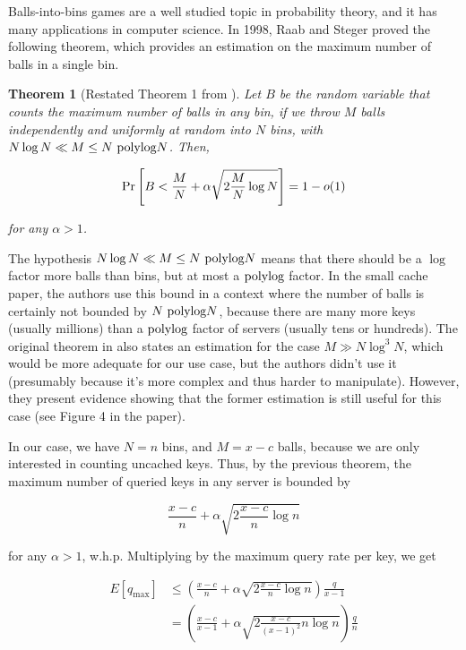 \documentclass[10pt,letterpaper]{article}
\newcommand{\pr}{{\normalfont \text{Pr}}}
\newcommand{\polylog}{{\normalfont \text{polylog}}}
\newtheorem{theorem}{Theorem}
\begin{document}
Balls-into-bins games are a well studied topic in probability theory, and it has many applications in computer science. In 1998, Raab and Steger \cite{Raab98} proved the following theorem, which provides an estimation on the maximum number of balls in a single bin.

\begin{theorem}[Restated Theorem 1 from \cite{Raab98}] Let $B$ be the random variable that counts the maximum number of balls in any bin, if we throw $M$ balls independently and uniformly at random into $N$ bins, with $N \log N \ll M \leq N \text{ }\polylog N$. Then,

\[\pr\left[B < \frac{M}{N} + \alpha \sqrt{2 \frac{M}{N} \log N}\right] = 1 - o(1)\]

\noindent
for any $\alpha > 1$.
\end{theorem}

The hypothesis $N \log N \ll M \leq N \text{ }\polylog N$ means that there should be a $\log$ factor more balls than bins, but at most a $\polylog$ factor. In the small cache paper, the authors use this bound in a context where the number of balls is certainly not bounded by $N \text{ } \polylog N$, because there are many more keys (usually millions) than a $\polylog$ factor of servers (usually tens or hundreds). The original theorem in \cite{Raab98} also states an estimation for the case $M \gg N \log^3 N$, which would be more adequate for our use case, but the authors didn't use it (presumably because it's more complex and thus harder to manipulate). However, they present evidence showing that the former estimation is still useful for this case (see Figure 4 in the paper).

In our case, we have $N = n$ bins, and $M = x - c$ balls, because we are only interested in counting uncached keys. Thus, by the previous theorem, the maximum number of queried keys in any server is bounded by

\[
\frac{x - c}{n} + \alpha \sqrt{2 \frac{x - c}{n} \log n}
\]

\noindent
for any $\alpha > 1$, w.h.p. Multiplying by the maximum query rate per key, we get

\begin{align*}
E[q_{\max}] &\leq \left(\frac{x - c}{n} + \alpha \sqrt{2 \frac{x - c}{n} \log n}\right) \frac{q}{x - 1}\\
&= \left(\frac{x - c}{x - 1} + \alpha \sqrt{2 \frac{x - c}{(x - 1)^2} n \log n}\right) \frac{q}{n}
\end{align*}
\end{document}
